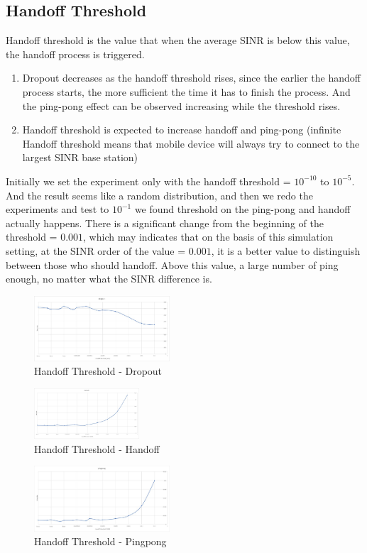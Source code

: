 \documentclass[a4paper]{IEEEtran}
\begin{document}
\subsection{Handoff Threshold}
Handoff threshold is the value that when the average SINR is below
this value, the handoff process is triggered.
\begin{enumerate}
\item{Dropout decreases as the handoff threshold rises, since the earlier the handoff process starts, the more sufficient the time it has to finish the process. And the ping-pong effect can be observed increasing while the threshold rises.}
\item{Handoff threshold is expected to increase handoff and
ping-pong (infinite Handoff threshold means that
mobile device will always try to connect to the largest SINR base station)}
\end{enumerate}
Initially we set the experiment only with the handoff threshold = $10^{−10}$ to $10^{−5}$. And the result seems like a random distribution, and then we redo the experiments and test to $10^{−1}$ we found threshold on the ping-pong and handoff actually happens. There is a significant change from the beginning of the threshold = $0.001$, which may indicates that on the basis of this simulation setting, at the SINR order of the value = $0.001$, it is a better value to distinguish between those who should handoff. Above this value, a large number of ping enough, no matter what the SINR difference is.

\begin{figure}[h]
    \includegraphics[width=0.45\textwidth]{handoffthreshold/dropout}
    \caption{Handoff Threshold - Dropout}
    \label{fig:mesh1}
\end{figure}
\begin{figure}[h]
    \includegraphics[width=0.35\textwidth]{handoffthreshold/handoff}
    \caption{Handoff Threshold - Handoff}
    \label{fig:mesh2}
\end{figure}
\begin{figure}[h]
    \includegraphics[width=0.45\textwidth]{handoffthreshold/pingpong}
    \caption{Handoff Threshold - Pingpong}
    \label{fig:mesh3}
\end{figure}
\end{document}
